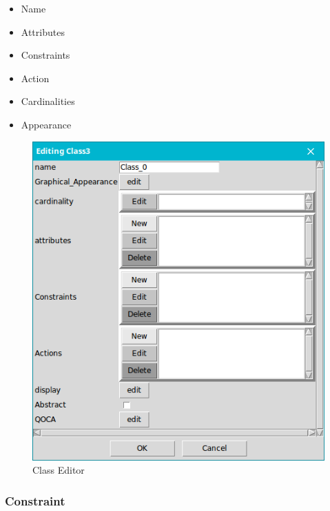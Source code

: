 \begin{minipage}{0.5\textwidth}
\begin{itemize}
\newcommand{\localtextbulletone}{\textcolor{gray}{\raisebox{.45ex}{\rule{.6ex}{.6ex}}}}
\renewcommand{\labelitemi}{\localtextbulletone}
\item Name
\item Attributes
\item Constraints
\item Action
\item Cardinalities
\item Appearance
\end{itemize}
\end{minipage} \hfill
\begin{minipage}{0.45\textwidth}
\begin{figure}[H]
\centering
		\includegraphics[scale=0.4]{ch3/img/class}
	\caption{\label{fig:Class Editor}Class Editor}
\end{figure}
\end{minipage}

\vspace{1cm}

\subsubsection{Constraint}

